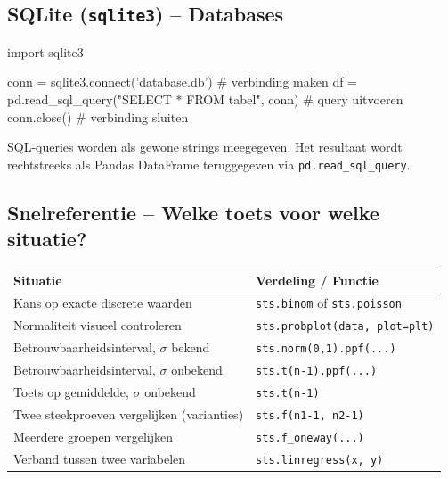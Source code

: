 \documentclass[a4paper,11pt]{article}
\begin{document}
\subsection{SQLite (\texttt{sqlite3}) -- Databases}

\begin{pyblock}
import sqlite3

conn = sqlite3.connect('database.db')              # verbinding maken
df = pd.read_sql_query("SELECT * FROM tabel", conn)  # query uitvoeren
conn.close()                                       # verbinding sluiten
\end{pyblock}

SQL-queries worden als gewone strings meegegeven.
Het resultaat wordt rechtstreeks als Pandas DataFrame teruggegeven via \texttt{pd.read\_sql\_query}.

\subsection{Snelreferentie -- Welke toets voor welke situatie?}

\begin{center}
\renewcommand{\arraystretch}{1.3}
\begin{tabularx}{\linewidth}{@{}lX@{}}
\toprule
\textbf{Situatie} & \textbf{Verdeling / Functie} \\
\midrule
Kans op exacte discrete waarden & \texttt{sts.binom} of \texttt{sts.poisson} \\
Normaliteit visueel controleren & \texttt{sts.probplot(data, plot=plt)} \\
Betrouwbaarheidsinterval, $\sigma$ bekend & \texttt{sts.norm(0,1).ppf(...)} \\
Betrouwbaarheidsinterval, $\sigma$ onbekend & \texttt{sts.t(n-1).ppf(...)} \\
Toets op gemiddelde, $\sigma$ onbekend & \texttt{sts.t(n-1)} \\
Twee steekproeven vergelijken (varianties) & \texttt{sts.f(n1-1, n2-1)} \\
Meerdere groepen vergelijken & \texttt{sts.f\_oneway(...)} \\
Verband tussen twee variabelen & \texttt{sts.linregress(x, y)} \\
\bottomrule
\end{tabularx}
\end{center}

\appendix
\printsymbols
\printformularium
\end{document}
